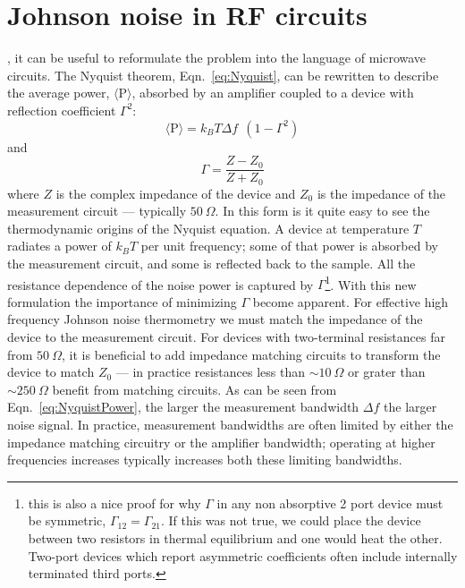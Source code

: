 \section{Johnson noise in RF circuits}
, it can be useful to reformulate the problem into the language of microwave circuits. The Nyquist theorem, Eqn.~\ref{eq:Nyquist}, can be rewritten to describe the average power, $\langle\mathrm{P}\rangle$, absorbed by an amplifier coupled to a device with reflection coefficient $\Gamma^2$:
\begin{equation}\label{eq:NyquistPower}
\langle\mathrm{P}\rangle = k_BT\Delta f~~(1-\Gamma^2)
\end{equation}
and
\begin{equation}\label{eq:Gamma}
\Gamma = \frac{Z-Z_0}{Z+Z_0}
\end{equation}
where $Z$ is the complex impedance of the device and $Z_0$ is the impedance of the measurement circuit --- typically $50~\Omega$. In this form is it quite easy to see the thermodynamic origins of the Nyquist equation. A device at temperature $T$ radiates a power of $k_BT$ per unit frequency; some of that power is absorbed by the measurement circuit, and some is reflected back to the sample. All the resistance dependence of the noise power is captured by $\Gamma$\footnote{this is also a nice proof for why $\Gamma$ in any non absorptive 2 port device must be symmetric, $\Gamma_{12}=\Gamma_{21}$. If this was not true, we could place the device between two resistors in thermal equilibrium and one would heat the other. Two-port devices which report asymmetric coefficients often include internally terminated third ports.}.
With this new formulation the importance of minimizing $\Gamma$ become apparent. For effective high frequency Johnson noise thermometry we must match the impedance of the device to the measurement circuit. For devices with two-terminal resistances far from $50~\Omega$, it is beneficial to add impedance matching circuits to transform the device to match $Z_0$ --- in practice resistances less than $\sim 10~\Omega$ or grater than $\sim 250~\Omega$ benefit from matching circuits.
As can be seen from Eqn.~\ref{eq:NyquistPower}, the larger the measurement bandwidth $\Delta f$ the larger noise signal. In practice, measurement bandwidths are often limited by either the impedance matching circuitry or the amplifier bandwidth; operating at higher frequencies increases typically increases both these limiting bandwidths.

